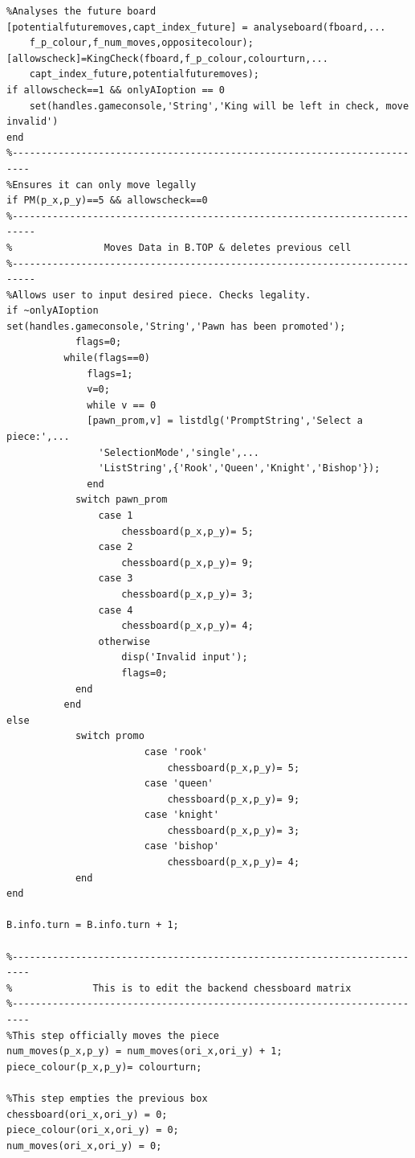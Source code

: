 \documentclass[11pt,a4paper]{article}
\begin{document}
\begin{lstlisting}
%Analyses the future board
[potentialfuturemoves,capt_index_future] = analyseboard(fboard,...
    f_p_colour,f_num_moves,oppositecolour);
[allowscheck]=KingCheck(fboard,f_p_colour,colourturn,...
    capt_index_future,potentialfuturemoves);
if allowscheck==1 && onlyAIoption == 0
    set(handles.gameconsole,'String','King will be left in check, move invalid')
end
%-------------------------------------------------------------------------
%Ensures it can only move legally
if PM(p_x,p_y)==5 && allowscheck==0
%--------------------------------------------------------------------------
%                Moves Data in B.TOP & deletes previous cell
%--------------------------------------------------------------------------
%Allows user to input desired piece. Checks legality.
if ~onlyAIoption
set(handles.gameconsole,'String','Pawn has been promoted');
            flags=0;
          while(flags==0)
              flags=1;
              v=0;
              while v == 0
              [pawn_prom,v] = listdlg('PromptString','Select a piece:',...
                'SelectionMode','single',...
                'ListString',{'Rook','Queen','Knight','Bishop'});
              end
            switch pawn_prom
                case 1
                    chessboard(p_x,p_y)= 5;
                case 2
                    chessboard(p_x,p_y)= 9;
                case 3
                    chessboard(p_x,p_y)= 3;
                case 4
                    chessboard(p_x,p_y)= 4;
                otherwise
                    disp('Invalid input');
                    flags=0;
            end   
          end
else
            switch promo
                        case 'rook'
                            chessboard(p_x,p_y)= 5;
                        case 'queen'
                            chessboard(p_x,p_y)= 9;
                        case 'knight'
                            chessboard(p_x,p_y)= 3;
                        case 'bishop'
                            chessboard(p_x,p_y)= 4;
            end   
end

B.info.turn = B.info.turn + 1;

%-------------------------------------------------------------------------
%              This is to edit the backend chessboard matrix
%-------------------------------------------------------------------------
%This step officially moves the piece
num_moves(p_x,p_y) = num_moves(ori_x,ori_y) + 1;
piece_colour(p_x,p_y)= colourturn;
 
%This step empties the previous box
chessboard(ori_x,ori_y) = 0;
piece_colour(ori_x,ori_y) = 0;
num_moves(ori_x,ori_y) = 0;


\end{lstlisting}
\end{document}
